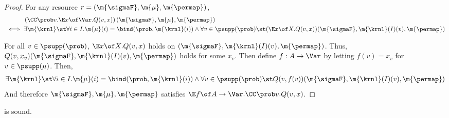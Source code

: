 \begin{proof}
  For any resource $r = (\m{\sigmaF}, \m{\mu}, \m{\permap})$,
  \begin{align*}
    &
    \left(\CC\prob v. \E x \of \Var. Q(v, x) \right) (\m{\sigmaF}, \m{\mu}, \m{\permap}) \\
    {}\iff {} &
    \exists \m{\krnl} \st
             \forall i \in I.
             \m{\mu}(i) = \bind(\prob, \m{\krnl}(i))
    {}\land{}
    \forall v\in  \psupp(\prob) \st
     (\E x \of X. Q(v, x))(\m{\sigmaF}, \m{\krnl}(I)(v), \m{\permap})
  \end{align*}

   For all $v\in \psupp(\prob)$,
   $\E x \of X. Q(v, x)$ holds on $(\m{\sigmaF}, \m{\krnl}(I)(v), \m{\permap})$.
   Thus,
   $Q(v, x_v)(\m{\sigmaF}, \m{\krnl}(I)(v), \m{\permap})$
   holds for some $x_v$.
   Then define $f: A \to \Var$ by letting $f(v) = x_v$ for $v \in \psupp(\mu)$.
   Then,
   \begin{align*}
   \exists \m{\krnl} \st
             \forall i \in I.
             \m{\mu}(i) = \bind(\prob, \m{\krnl}(i))
               {}\land{}
              \forall v\in  \psupp(\prob) \st
      Q(v, f(v))(\m{\sigmaF}, \m{\krnl}(I)(v), \m{\permap})
  \end{align*}
  And therefore $\m{\sigmaF}, \m{\mu}, \m{\permap}$
  satisfies ${\E f \of A \to \Var. \CC\prob v. Q(v, x)}$.
\end{proof} \begin{lemma}
\label{proof:c-transf}
   is sound.
\end{lemma}

